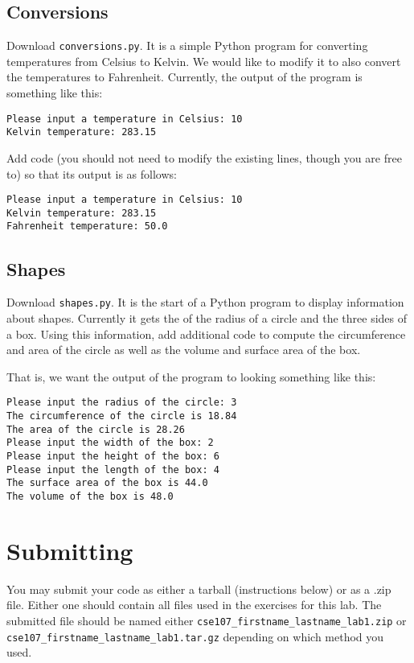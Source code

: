 \documentclass[12pt,hidelinks]{article}
\begin{document}
\subsection{Conversions}
Download \texttt{conversions.py}. It is a simple Python program for converting temperatures from Celsius to Kelvin. We would like to modify it to also convert the temperatures to Fahrenheit. Currently, the output of the program is something like this:

\begin{lstlisting}[style=bash]
Please input a temperature in Celsius: 10
Kelvin temperature: 283.15
\end{lstlisting}

Add code (you should not need to modify the existing lines, though you are free to) so that its output is as follows:

\begin{lstlisting}[style=bash]
Please input a temperature in Celsius: 10
Kelvin temperature: 283.15
Fahrenheit temperature: 50.0
\end{lstlisting}

\subsection{Shapes}
Download \texttt{shapes.py}. It is the start of a Python program to display information about shapes. Currently it gets the of the radius of a circle and the three sides of a box. Using this information, add additional code to compute the circumference and area of the circle as well as the volume and surface area of the box.

That is, we want the output of the program to looking something like this:

\begin{lstlisting}[style=bash]
Please input the radius of the circle: 3
The circumference of the circle is 18.84
The area of the circle is 28.26
Please input the width of the box: 2
Please input the height of the box: 6
Please input the length of the box: 4
The surface area of the box is 44.0
The volume of the box is 48.0
\end{lstlisting}

\pagebreak
\section{Submitting}

You may submit your code as either a tarball (instructions below) or as a .zip file. Either one should contain all files used in the exercises for this lab. The submitted file should be named either \texttt{cse107\_firstname\_lastname\_lab1.zip} or \texttt{cse107\_firstname\_lastname\_lab1.tar.gz} depending on which method you used.
\end{document}
